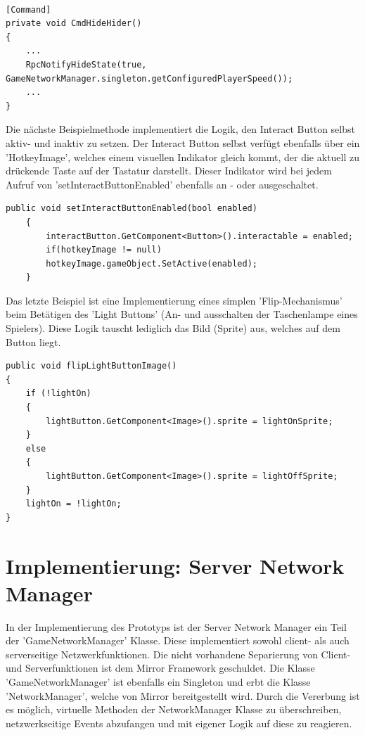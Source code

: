\begin{lstlisting}[caption= HiderScript.cs Subscribe to InGameUiControllerScript Event]
	
[Command]
private void CmdHideHider()
{
	...
	RpcNotifyHideState(true, GameNetworkManager.singleton.getConfiguredPlayerSpeed());
	...
}	
\end{lstlisting}

Die nächste Beispielmethode implementiert die Logik, den Interact Button selbst aktiv- und inaktiv zu setzen. Der Interact Button selbst verfügt ebenfalls über ein 'HotkeyImage', welches einem visuellen Indikator gleich kommt, der die aktuell zu drückende Taste auf der Tastatur darstellt. Dieser Indikator wird bei jedem Aufruf von 'setInteractButtonEnabled' ebenfalls an - oder ausgeschaltet.

\begin{lstlisting}[caption= InGameUiControllerScript.cs setInteractButtonEnabled]
public void setInteractButtonEnabled(bool enabled)
	{
		interactButton.GetComponent<Button>().interactable = enabled;
		if(hotkeyImage != null)
		hotkeyImage.gameObject.SetActive(enabled);
	}
\end{lstlisting}

Das letzte Beispiel ist eine Implementierung eines simplen 'Flip-Mechanismus' beim Betätigen des 'Light Buttons' (An- und ausschalten der Taschenlampe eines Spielers). Diese Logik tauscht lediglich das Bild (Sprite) aus, welches auf dem Button liegt.

\begin{lstlisting}[caption= InGameUiControllerScript.cs flipLightButtonImage]
public void flipLightButtonImage()
{
	if (!lightOn)
	{
		lightButton.GetComponent<Image>().sprite = lightOnSprite;
	}
	else
	{
		lightButton.GetComponent<Image>().sprite = lightOffSprite;
	}
	lightOn = !lightOn;
}
\end{lstlisting}


\section{Implementierung: Server Network Manager}

In der Implementierung des Prototyps ist der Server Network Manager ein Teil der 'GameNetworkManager' Klasse. Diese implementiert sowohl client- als auch serverseitige Netzwerkfunktionen. Die nicht vorhandene Separierung von Client- und Serverfunktionen ist dem Mirror Framework geschuldet. Die Klasse 'GameNetworkManager' ist ebenfalls ein Singleton und erbt die Klasse 'NetworkManager', welche von Mirror bereitgestellt wird. Durch die Vererbung ist es möglich, virtuelle Methoden\cite{Billwagner.08.02.2022} der NetworkManager Klasse zu überschreiben, netzwerkseitige Events abzufangen und mit eigener Logik auf diese zu reagieren. 

